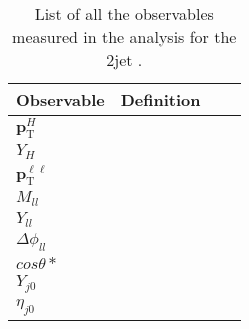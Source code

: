 \begin{table}[!htbp]
  \centering
    \begin{tabularx}{\textwidth}{lclc}
    \toprule
    \midrule
    {Observable}     &  {Definition} \\  
    \midrule
    \midrule

    $\boldsymbol{p}_{\mathrm{T}}^{H}$          &  \\ 
    $Y_{H}$          &  \\ 
    \midrule
    $\boldsymbol{p}_{\mathrm{T}}^{\ell \ell}$          &  \\ 
    $M_{ll}$          &  \\ 
    $Y_{ll}$          &  \\ 
     $\Delta \phi_{ll}$          &  \\ 
    $cos \theta{*}$         &  \\ 
    \midrule
    $Y_{j0}$          &  \\ 
    $\eta_{j0}$          &  \\ 

    
    \bottomrule
    \end{tabularx}%
  \caption{List of all the observables measured in the analysis for the 2jet .}
  \label{table1}%
 \end{table}%











































